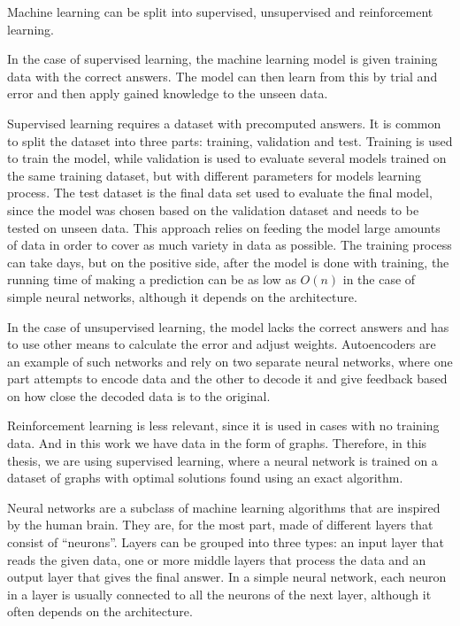 Machine learning can be split into supervised, unsupervised and reinforcement learning. 

In the case of supervised learning, the machine learning model is given training data with the correct answers. The model can then learn from this by trial and error and then apply gained knowledge to the unseen data. 

Supervised learning requires a dataset with precomputed answers. It is common to split the dataset into three parts: training, validation and test. Training is used to train the model, while validation is used to evaluate several models trained on the same training dataset, but with different parameters for models learning process. The test dataset is the final data set used to evaluate the final model, since the model was chosen based on the validation dataset and needs to be tested on unseen data. This approach relies on feeding the model large amounts of data in order to cover as much variety in data as possible. The training process can take days, but on the positive side, after the model is done with training, the running time of making a prediction can be as low as $O(n)$ in the case of simple neural networks, although it depends on the architecture. 

In the case of unsupervised learning, the model lacks the correct answers and has to use other means to calculate the error and adjust weights. Autoencoders are an example of such networks and rely on two separate neural networks, where one part attempts to encode data and the other to decode it and give feedback based on how close the decoded data is to the original. 

Reinforcement learning is less relevant, since it is used in cases with no training data. And in this work we have data in the form of graphs. Therefore, in this thesis, we are using supervised learning, where a neural network is trained on a dataset of graphs with optimal solutions found using an exact algorithm. 

Neural networks are a subclass of machine learning algorithms that are inspired by the human brain. They are, for the most part, made of different layers that consist of “neurons”. Layers can be grouped into three types: an input layer that reads the given data, one or more middle layers that process the data and an output layer that gives the final answer. In a simple neural network, each neuron in a layer is usually connected to all the neurons of the next layer, although it often depends on the architecture. 

